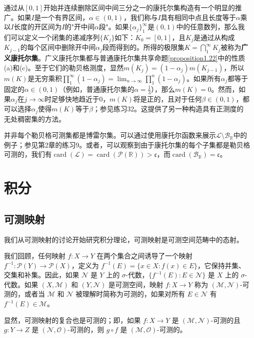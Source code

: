 \documentclass[lang=cn,10pt,thmcnt=section]{elegantbook}
\begin{document}
通过从$[0,1]$开始并连续删除区间中间三分之一的康托尔集构造有一个明显的推广。如果$I$是一个有界区间，$\alpha \in (0,1)$，我们称与$I$具有相同中点且长度等于$\alpha$乘以$I$长度的开区间为$I$的"开中间$\alpha$段"。如果$\{\alpha_j\}_{1}^{\infty}$是$(0,1)$中的任意数列，那么我们可以定义一个闭集的递减序列$\{K_j\}$如下：$K_0 = [0,1]$，且$K_j$是通过从构成$K_{j-1}$的每个区间中删除开中间$\alpha_j$段而得到的。所得的极限集$K = \bigcap_{1}^{\infty} K_j$被称为\textbf{广义康托尔集}。广义康托尔集都与普通康托尔集共享命题\ref{proposition1.22}中的性质(a)和(c)。至于它们的勒贝格测度，显然$m(K_j) = (1-\alpha_j)m(K_{j-1})$，所以$m(K)$是无穷乘积$\prod_{1}^{\infty}(1-\alpha_j) = \lim_{n\to\infty}\prod_{1}^{n}(1-\alpha_j)$。如果所有$\alpha_j$都等于固定的$\alpha \in (0,1)$（例如，普通康托尔集的$\alpha = \frac{1}{3}$），那么$m(K) = 0$。然而，如果$\alpha_j$在$j \to \infty$时足够快地趋近于0，$m(K)$将是正的，且对于任何$\beta \in (0,1)$，都可以选择$\alpha_j$使得$m(K)$等于$\beta$；参见练习32。这提供了另一种构造具有正测度的无处稠密集的方法。

并非每个勒贝格可测集都是博雷尔集。可以通过使用康托尔函数来展示$\mathcal{L}\setminus\mathcal{B}_{\mathbb{R}}$中的例子；参见第2章的练习9。或者，可以观察到由于康托尔集的每个子集都是勒贝格可测的，我们有$\operatorname{card}(\mathcal{L}) = \operatorname{card}(\mathcal{P}(\mathbb{R})) > \mathfrak{c}$，而$\operatorname{card}(\mathcal{B}_{\mathbb{R}}) = \mathfrak{c}$。

\chapter{积分}

\section{可测映射}

我们从可测映射的讨论开始研究积分理论，可测映射是可测空间范畴中的态射。

我们回顾，任何映射 $f : X \to Y$ 在两个集合之间诱导了一个映射 $f^{-1} : \mathcal{P}(Y) \to \mathcal{P}(X)$，定义为 $f^{-1}(E) = \{x \in X : f(x) \in E\}$，它保持并集、交集和补集。因此，如果 $\mathcal{N}$ 是 $Y$ 上的 $\sigma$-代数，$\{f^{-1}(E) : E \in \mathcal{N}\}$ 是 $X$ 上的 $\sigma$-代数。如果 $(X,\mathcal{M})$ 和 $(Y,\mathcal{N})$ 是可测空间，映射 $f : X \to Y$ 称为 $(\mathcal{M},\mathcal{N})$-可测的，或者当 $\mathcal{M}$ 和 $\mathcal{N}$ 被理解时简称为可测的，如果对所有 $E \in \mathcal{N}$ 有 $f^{-1}(E) \in \mathcal{M}$。

显然，可测映射的复合也是可测的；即，如果 $f : X \to Y$ 是 $(\mathcal{M},\mathcal{N})$-可测的且 $g : Y \to Z$ 是 $(\mathcal{N},\mathcal{O})$-可测的，则 $g \circ f$ 是 $(\mathcal{M},\mathcal{O})$-可测的。
\end{document}
